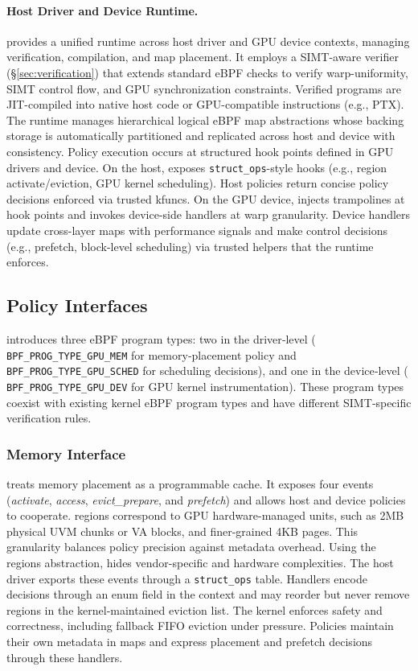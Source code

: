 \paragraph{Host Driver and Device Runtime.}
\sys provides a unified runtime across host driver and GPU device contexts, managing verification, compilation, and map placement. It employs a SIMT-aware verifier (\S\ref{sec:verification}) that extends standard eBPF checks to verify warp-uniformity, SIMT control flow, and GPU synchronization constraints. Verified programs are JIT-compiled into native host code or GPU-compatible instructions (e.g., PTX). The runtime manages hierarchical logical eBPF map abstractions whose backing storage is automatically partitioned and replicated across host and device with consistency.
Policy execution occurs at structured hook points defined in GPU drivers and device. On the host, \sysdriver exposes \texttt{struct\_ops}-style hooks (e.g., region activate/eviction, GPU kernel scheduling). Host policies return concise policy decisions enforced via trusted kfuncs. On the GPU device, \sys injects trampolines at hook points and invokes device-side handlers at warp granularity. Device handlers update cross-layer maps with performance signals and make control decisions (e.g., prefetch, block-level scheduling) via trusted helpers that the runtime enforces.

\subsection{\sys{} Policy Interfaces}
\label{sec:design-interfaces}

\sys introduces three eBPF program types: two in the driver‑level ( \texttt{BPF\_PROG\_TYPE\_GPU\_MEM} for memory‑placement policy and \texttt{BPF\_PROG\_TYPE\_GPU\_SCHED} for scheduling decisions), and one in the device‑level ( \texttt{BPF\_PROG\_TYPE\_GPU\_DEV} for GPU kernel instrumentation).
These program types coexist with existing kernel eBPF program types and have different SIMT‑specific verification rules.

\subsubsection{Memory Interface}
\label{sec:design-mem}

\sys treats memory placement as a programmable cache. It exposes four events (\emph{activate}, \emph{access}, \emph{evict\_prepare}, and \emph{prefetch}) and allows host and device policies to cooperate. \sys regions correspond to GPU hardware-managed units, such as 2MB physical UVM chunks or VA blocks, and finer-grained 4KB pages. This granularity balances policy precision against metadata overhead. Using the regions abstraction, \sys hides vendor-specific and hardware complexities. The host driver exports these events through a \texttt{struct\_ops} table. Handlers encode decisions through an enum field in the context and may reorder but never remove regions in the kernel‑maintained eviction list. The kernel enforces safety and correctness, including fallback FIFO eviction under pressure. Policies maintain their own metadata in maps and express placement and prefetch decisions through these handlers.

